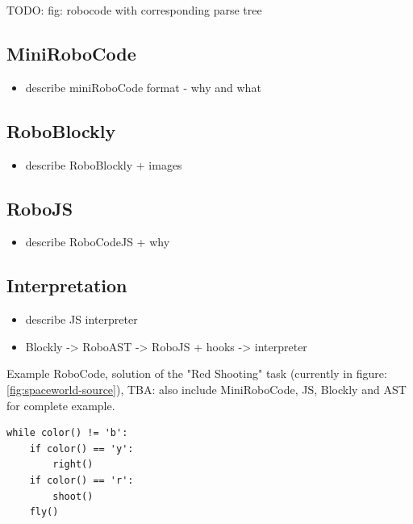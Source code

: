 TODO: fig: robocode with corresponding parse tree

\subsection{MiniRoboCode}

\begin{itemize}
\item describe miniRoboCode format - why and what
\end{itemize}

\subsection{RoboBlockly}

\begin{itemize}
\item describe RoboBlockly + images
\end{itemize}


\subsection{RoboJS}

\begin{itemize}
\item describe RoboCodeJS + why
\end{itemize}

\subsection{Interpretation}

\begin{itemize}
\item describe JS interpreter
\item Blockly -> RoboAST -> RoboJS + hooks -> interpreter
\end{itemize}


Example RoboCode, solution of the "Red Shooting" task (currently in figure: \ref{fig:spaceworld-source}), TBA: also include MiniRoboCode, JS, Blockly and AST for complete example.

\begin{lstlisting}
while color() != 'b':
    if color() == 'y':
        right()
    if color() == 'r':
        shoot()
    fly()
\end{lstlisting}
